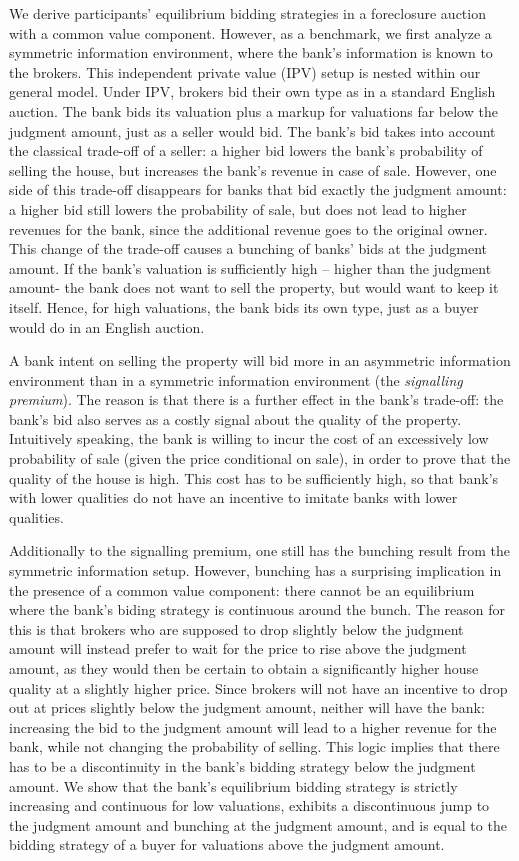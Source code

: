 \documentclass[11pt,twopage]{article}
\begin{document}
We derive participants' equilibrium bidding strategies in a
foreclosure auction with a common value component. However, as a
benchmark, we first analyze a symmetric information environment, where
the bank's information is known to the brokers. This independent
private value (IPV) setup is nested within our general model. Under
IPV, brokers bid their own type as in a standard English auction. The
bank bids its valuation plus a markup for valuations far below the
judgment amount, just as a seller would bid. The bank's bid takes into
account the classical trade-off of a seller: a higher bid lowers the
bank's probability of selling the house, but increases the bank's
revenue in case of sale. However, one side of this trade-off
disappears for banks that bid exactly the judgment amount: a higher
bid still lowers the probability of sale, but does not lead to higher
revenues for the bank, since the additional revenue goes to the
original owner. This change of the trade-off causes a bunching of
banks' bids at the judgment amount. If the bank's valuation is
sufficiently high -- higher than the judgment amount- the bank does
not want to sell the property, but would want to keep it
itself. Hence, for high valuations, the bank bids its own type, just
as a buyer would do in an English auction.

A bank intent on selling the property will bid more in an asymmetric
information environment than in a symmetric information environment
(the \emph{signalling premium}). The reason is that there is a further
effect in the bank's trade-off: the bank's bid also serves as a costly
signal about the quality of the property. Intuitively speaking, the
bank is willing to incur the cost of an excessively low probability of
sale (given the price conditional on sale), in order to prove that the
quality of the house is high. This cost has to be sufficiently high,
so that bank's with lower qualities do not have an incentive to
imitate banks with lower qualities.

Additionally to the signalling premium, one still has the bunching
result from the symmetric information setup. However, bunching has a
surprising implication in the presence of a common value component:
there cannot be an equilibrium where the bank's biding strategy is
continuous around the bunch. The reason for this is that brokers who
are supposed to drop slightly below the judgment amount will instead
prefer to wait for the price to rise above the judgment amount, as
they would then be certain to obtain a significantly higher house
quality at a slightly higher price. Since brokers will not have an
incentive to drop out at prices slightly below the judgment amount,
neither will have the bank: increasing the bid to the judgment amount
will lead to a higher revenue for the bank, while not changing the
probability of selling. This logic implies that there has to be a
discontinuity in the bank's bidding strategy below the judgment
amount. We show that the bank's equilibrium bidding strategy is
strictly increasing and continuous for low valuations, exhibits a
discontinuous jump to the judgment amount and bunching at the judgment
amount, and is equal to the bidding strategy of a buyer for valuations
above the judgment amount.
\end{document}
